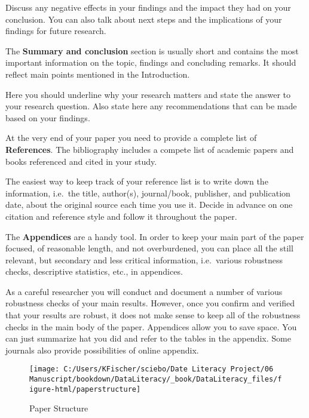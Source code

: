 \documentclass[
]{book}
\begin{document}
Discuss any negative effects in your findings and the impact they had on
your conclusion. You can also talk about next steps and the implications
of your findings for future research.

The \textbf{Summary and conclusion} section is usually short and
contains the most important information on the topic, findings and
concluding remarks. It should reflect main points mentioned in the
Introduction.

Here you should underline why your research matters and state the answer
to your research question. Also state here any recommendations that can
be made based on your findings.

At the very end of your paper you need to provide a complete list of
\textbf{References}. The bibliography includes a compete list of
academic papers and books referenced and cited in your study.

The easiest way to keep track of your reference list is to write down
the information, i.e.~the title, author(s), journal/book, publisher, and
publication date, about the original source each time you use it. Decide
in advance on one citation and reference style and follow it throughout
the paper.

The \textbf{Appendices} are a handy tool. In order to keep your main
part of the paper focused, of reasonable length, and not overburdened,
you can place all the still relevant, but secondary and less critical
information, i.e.~various robustness checks, descriptive statistics,
etc., in appendices.

As a careful researcher you will conduct and document a number of
various robustness checks of your main results. However, once you
confirm and verified that your results are robust, it does not make
sense to keep all of the robustness checks in the main body of the
paper. Appendices allow you to save space. You can just summarize hat
you did and refer to the tables in the appendix. Some journals also
provide possibilities of online appendix.

\begin{figure}

{\centering \texttt{[image: C:/Users/KFischer/sciebo/Date Literacy Project/06 Manuscript/bookdown/DataLiteracy/\_book/DataLiteracy\_files/figure-html/paperstructure]} 

}

\caption{Paper Structure}\label{fig:paper_structure}
\end{figure}
\end{document}
